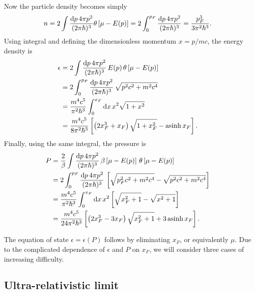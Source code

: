 Now the particle density  becomes simply
\begin{equation}
	n = 
	2 \int \frac{\mathop{}\!\mathrm{d} p \, 4 \pi p^2}{(2 \pi \hbar)^3} \theta \left[ \mu - E(p) \right] =
	2 \int_0^{p_F} \frac{\mathop{}\!\mathrm{d} p \, 4 \pi p^2}{(2 \pi \hbar)^3} = \frac{p_F^3}{3 \pi^2 \hbar^3} .
\end{equation}
Using integral  and defining the dimensionless momentum $x = p / mc$, the energy density is
\begin{equation}
\begin{split}
	\epsilon &=  2 \int \frac{\mathop{}\!\mathrm{d} p \, 4 \pi p^2}{(2 \pi \hbar)^3} \, E(p) \, \theta \left[ \mu - E(p) \right] \\
	         &=  2 \int_0^{p_F} \frac{\mathop{}\!\mathrm{d} p \, 4 \pi p^2}{(2 \pi \hbar)^3} \, \sqrt{p^2 c^2 + m^2 c^4} \\
	         &= \frac{m^4 c^5}{\pi^2 \hbar^3} \int_0^{x_F} \mathop{}\!\mathrm{d} x \, x^2 \sqrt{1 + x^2} \\
	         &= \frac{m^4 c^5}{8 \pi^2 \hbar^3} \left[ \left( 2 x_F^3 + x_F \right) \sqrt{1 + x_F^2} - \operatorname{asinh} x_F \right] . \\
\end{split}
\end{equation}
Finally, using the same integral, the pressure is
\begin{equation}
\begin{split}
	P &= \frac{2}{\beta} \int \frac{\mathop{}\!\mathrm{d} p \, 4 \pi p^2}{(2 \pi \hbar)^3} \, \beta \left[ \mu - E(p) \right] \, \theta \left[ \mu - E(p) \right] \\
	  &= 2 \int_0^{p_F} \frac{\mathop{}\!\mathrm{d} p \, 4 \pi p^2}{(2 \pi \hbar)^3} \, \left[ \sqrt{p_F^2 c^2 + m^2 c^4} - \sqrt{p^2 c^2 + m^2 c^4} \right] \\
	  &= \frac{m^4 c^5}{\pi^2 \hbar^3} \int_0^{x_F} \mathop{}\!\mathrm{d} x \, x^2 \left[ \sqrt{x_F^2+1} - \sqrt{x^2+1} \right] \\
	  &= \frac{m^4 c^5}{24 \pi^2 \hbar^3} \left[ \left( 2 x_F^3 - 3 x_F \right) \sqrt{x_F^2 + 1} + 3 \operatorname{asinh} x_F \right] . \\
\end{split}
\end{equation}

The equation of state $\epsilon = \epsilon(P)$ follows by eliminating $x_F$, or equivalently $\mu$.
Due to the complicated dependence of $\epsilon$ and $P$ on $x_F$, we will consider three cases of increasing difficulty.

\subsection{Ultra-relativistic limit}

